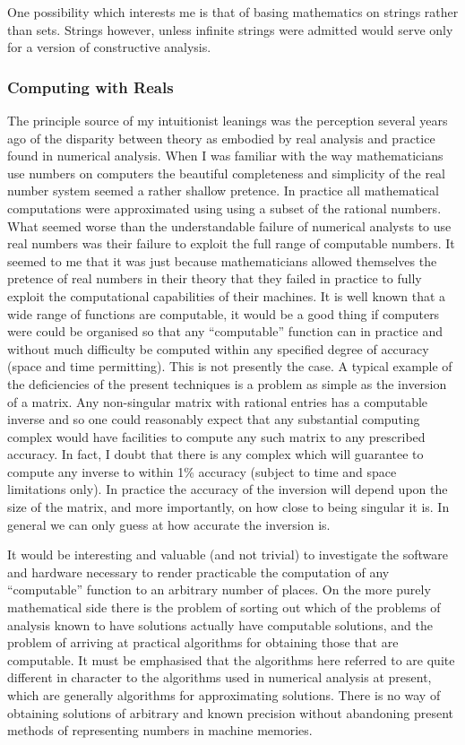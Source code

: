 \documentclass[10pt,titlepage]{book}
\begin{document}
One possibility which interests me is that of basing mathematics on strings rather than sets. Strings however, unless infinite strings were admitted would serve only for a version of constructive analysis.

\subsubsection{Computing with Reals}

The principle source of my intuitionist leanings was the perception several years ago of the disparity between theory as embodied by real analysis and practice found in numerical analysis.
When I was familiar with the way mathematicians use numbers on computers the beautiful completeness and simplicity of the real number system seemed a rather shallow pretence.
In practice all mathematical computations were approximated using using a subset of the rational numbers.
What seemed worse than the understandable failure of numerical analysts to use real numbers was their failure to exploit the full range of computable numbers.
It seemed to me that it was just because mathematicians allowed themselves the pretence of real numbers in their theory that they failed in practice to fully exploit the computational capabilities of their machines.
It is well known that a wide range of functions are computable, it would be a good thing if computers were could be organised so that any ``computable'' function can in practice and without much difficulty be computed within any specified degree of accuracy (space and time permitting).
This is not presently the case.
A typical example of the deficiencies of the present techniques is a problem as simple as the inversion of a matrix.
Any non-singular matrix with rational entries has a computable inverse and so one could reasonably expect that any substantial computing complex would have facilities to compute any such matrix to any prescribed accuracy.
In fact, I doubt that there is any complex which will guarantee to compute any inverse to within 1\% accuracy (subject to time and space limitations only).
In practice the accuracy of the inversion will depend upon the size of the matrix, and more importantly, on how close to being singular it is.
In general we can only guess at how accurate the inversion is.

It would be interesting and valuable (and not trivial) to investigate the software and hardware necessary to render practicable the computation of any ``computable'' function to an arbitrary number of places. On the more purely mathematical side there is the problem of sorting out which of the problems of analysis known to have solutions actually have computable solutions, and the problem of arriving at practical algorithms for obtaining those that are computable. It must be emphasised that the algorithms here referred to are quite different in character to the algorithms used in numerical analysis at present, which are generally algorithms for approximating solutions. There is no way of obtaining solutions of arbitrary and known precision without abandoning present methods of representing numbers in machine memories.
\end{document}
